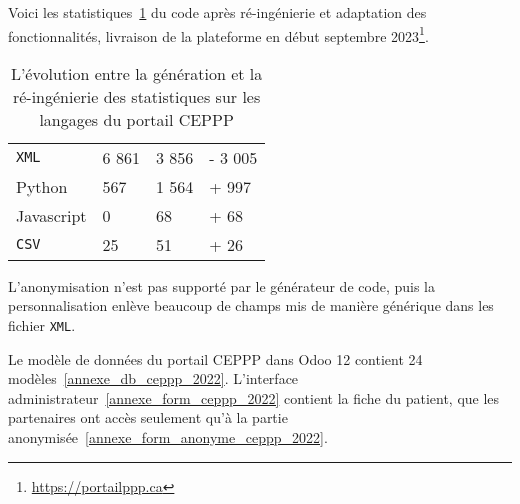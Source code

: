 Voici les statistiques~\ref{tab:stat_code_portail_ceppp} du code après ré-ingénierie et adaptation des fonctionnalités, livraison de la plateforme en début septembre 2023\footnote{\url{https://portailppp.ca}}.

\begin{table}[htb]
\caption{L'évolution entre la génération et la ré-ingénierie des statistiques sur les langages du portail CEPPP}
\centering
\begin{tabular}{|l|l|l|l|}

\hline
\cellcolor[HTML]{d9d9d9}{\textbf{Langage}} & \cellcolor[HTML]{d9d9d9}{\# Ligne extrait} & \cellcolor[HTML]{d9d9d9}{\# Ligne personnalisé} & \cellcolor[HTML]{d9d9d9}{\# Diff}\\\hline

\texttt{XML} & 6 861 & 3 856 & - 3 005\\\hline
Python & 567 & 1 564 & + 997\\\hline
Javascript & 0 & 68 & + 68\\\hline
\texttt{CSV} & 25 & 51 & + 26\\\hline

\end{tabular}
\label{tab:stat_code_portail_ceppp}
\end{table}

L'anonymisation n'est pas supporté par le générateur de code, puis la personnalisation enlève beaucoup de champs mis de manière générique dans les fichier \texttt{XML}. 

Le modèle de données du portail CEPPP dans Odoo 12 contient 24 modèles~\ref{annexe_db_ceppp_2022}. L'interface administrateur~\ref{annexe_form_ceppp_2022} contient la fiche du patient, que les partenaires ont accès seulement qu'à la partie anonymisée~\ref{annexe_form_anonyme_ceppp_2022}.


